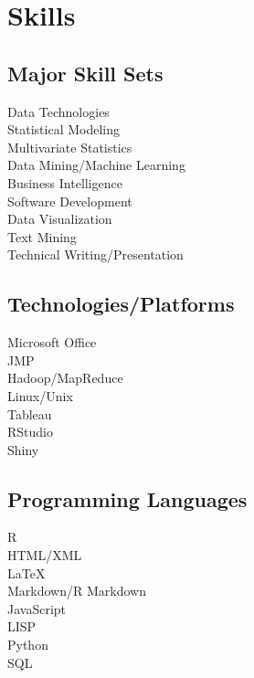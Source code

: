\documentclass[letterpaper]{deedy-resume} %
\begin{document}
\begin{minipage}[t]{0.35\textwidth}

\section{Skills}
\subsection{Major Skill Sets}
Data Technologies\\
Statistical Modeling\\
Multivariate Statistics\\
Data Mining/Machine Learning\\
Business Intelligence\\
Software Development\\
Data Visualization\\
Text Mining\\
Technical Writing/Presentation

\sectionspace %
\vspace{5pt}
\subsection{Technologies/Platforms}
Microsoft Office\\
JMP\\
Hadoop/MapReduce\\
Linux/Unix\\
Tableau\\
RStudio\\
Shiny

\sectionspace %
\vspace{5pt}
\subsection{Programming Languages}
R\\
HTML/XML\\
\LaTeX\\
Markdown/R Markdown\\
\vspace{5pt}
JavaScript\\
LISP\\
Python\\
SQL\\



\end{minipage} %
\end{document}

